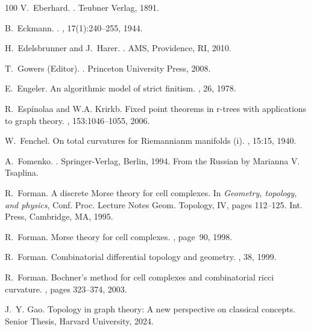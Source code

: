 \documentclass[12pt]{amsart}
\begin{document}
\begin{thebibliography}{100}
V.~Eberhard.
.
\newblock Teubner Verlag, 1891.

B.~Eckmann.
.
, 17(1):240--255, 1944.

H.~Edelsbrunner and J.~Harer.
.
\newblock AMS, Providence, RI, 2010.

T.~Gowers (Editor).
.
\newblock Princeton University Press, 2008.

E.~Engeler.
\newblock An algorithmic model of strict finitism.
, 26, 1978.

R.~Esp\'inolaa and W.A. Krirkb.
\newblock Fixed point theorems in r-trees with applications to graph theory.
, 153:1046--1055, 2006.

W.~Fenchel.
\newblock On total curvatures for {R}iemannianm manifolds (i).
, 15:15, 1940.

A.~Fomenko.
.
\newblock Springer-Verlag, Berlin, 1994.
\newblock From the {R}ussian by Marianna V. Tsaplina.

R.~Forman.
\newblock A discrete {M}orse theory for cell complexes.
\newblock In {\em Geometry, topology, and physics}, Conf. Proc. Lecture Notes
  Geom. Topology, IV, pages 112--125. Int. Press, Cambridge, MA, 1995.

R.~Forman.
\newblock Morse theory for cell complexes.
, page~90, 1998.

R.~Forman.
\newblock Combinatorial differential topology and geometry.
, 38, 1999.

R.~Forman.
\newblock Bochner's method for cell complexes and combinatorial ricci
  curvature.
, pages 323--374, 2003.

J.~Y. Gao.
\newblock Topology in graph theory: A new perspective on classical concepts.
\newblock Senior Thesis, Harvard University, 2024.


\end{thebibliography}
\end{document}
